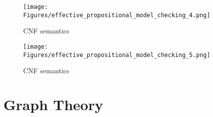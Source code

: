 \begin{figure}[H]
    \centering
    \texttt{[image: Figures/effective\_propositional\_model\_checking\_4.png]}
    \caption{CNF semantics}
    \label{fig:CNF}
\end{figure}


\begin{figure}[H]
    \centering
    \texttt{[image: Figures/effective\_propositional\_model\_checking\_5.png]}
    \caption{CNF semantics}
    \label{fig:CNF}
\end{figure}





\section{Graph Theory}









